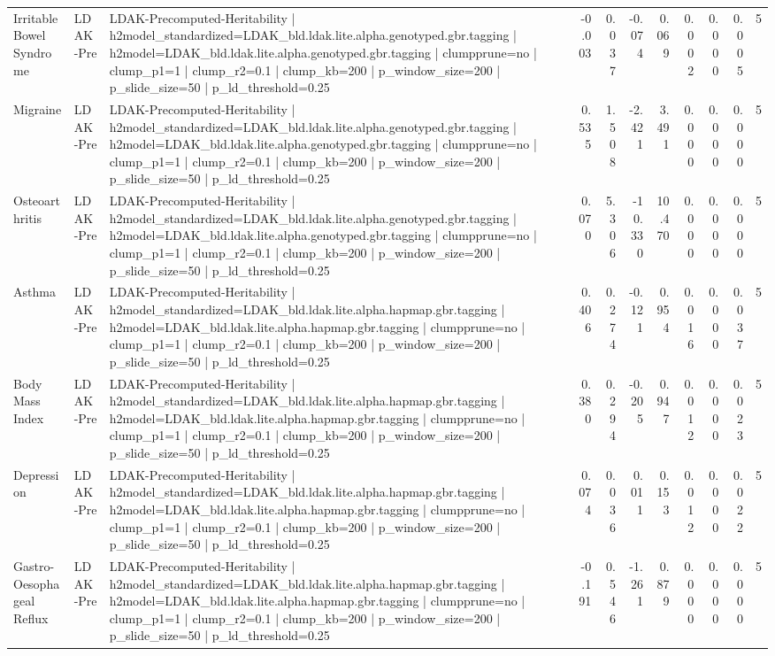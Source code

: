 \begin{landscape}
\begin{longtable}{p{2.4cm}p{1.8cm}p{6.0cm}rrrrrrrr}
Irritable Bowel Syndrome & LDAK-Pre & LDAK-Precomputed-Heritability | h2model\_standardized=LDAK\_bld.ldak.lite.alpha.genotyped.gbr.tagging | h2model=LDAK\_bld.ldak.lite.alpha.genotyped.gbr.tagging | clumpprune=no | clump\_p1=1 | clump\_r2=0.1 | clump\_kb=200 | p\_window\_size=200 | p\_slide\_size=50 | p\_ld\_threshold=0.25 & -0.003 & 0.037 & -0.074 & 0.069 & 0.002 & 0.000 & 0.005 & 5 \\
Migraine & LDAK-Pre & LDAK-Precomputed-Heritability | h2model\_standardized=LDAK\_bld.ldak.lite.alpha.genotyped.gbr.tagging | h2model=LDAK\_bld.ldak.lite.alpha.genotyped.gbr.tagging | clumpprune=no | clump\_p1=1 | clump\_r2=0.1 | clump\_kb=200 | p\_window\_size=200 | p\_slide\_size=50 | p\_ld\_threshold=0.25 & 0.535 & 1.508 & -2.421 & 3.491 & 0.000 & 0.000 & 0.000 & 5 \\
Osteoarthritis & LDAK-Pre & LDAK-Precomputed-Heritability | h2model\_standardized=LDAK\_bld.ldak.lite.alpha.genotyped.gbr.tagging | h2model=LDAK\_bld.ldak.lite.alpha.genotyped.gbr.tagging | clumpprune=no | clump\_p1=1 | clump\_r2=0.1 | clump\_kb=200 | p\_window\_size=200 | p\_slide\_size=50 | p\_ld\_threshold=0.25 & 0.070 & 5.306 & -10.330 & 10.470 & 0.000 & 0.000 & 0.000 & 5 \\
Asthma & LDAK-Pre & LDAK-Precomputed-Heritability | h2model\_standardized=LDAK\_bld.ldak.lite.alpha.hapmap.gbr.tagging | h2model=LDAK\_bld.ldak.lite.alpha.hapmap.gbr.tagging | clumpprune=no | clump\_p1=1 | clump\_r2=0.1 | clump\_kb=200 | p\_window\_size=200 | p\_slide\_size=50 | p\_ld\_threshold=0.25 & 0.406 & 0.274 & -0.121 & 0.954 & 0.016 & 0.000 & 0.037 & 5 \\
Body Mass Index & LDAK-Pre & LDAK-Precomputed-Heritability | h2model\_standardized=LDAK\_bld.ldak.lite.alpha.hapmap.gbr.tagging | h2model=LDAK\_bld.ldak.lite.alpha.hapmap.gbr.tagging | clumpprune=no | clump\_p1=1 | clump\_r2=0.1 | clump\_kb=200 | p\_window\_size=200 | p\_slide\_size=50 | p\_ld\_threshold=0.25 & 0.380 & 0.294 & -0.205 & 0.947 & 0.012 & 0.000 & 0.023 & 5 \\
Depression & LDAK-Pre & LDAK-Precomputed-Heritability | h2model\_standardized=LDAK\_bld.ldak.lite.alpha.hapmap.gbr.tagging | h2model=LDAK\_bld.ldak.lite.alpha.hapmap.gbr.tagging | clumpprune=no | clump\_p1=1 | clump\_r2=0.1 | clump\_kb=200 | p\_window\_size=200 | p\_slide\_size=50 | p\_ld\_threshold=0.25 & 0.074 & 0.036 & 0.011 & 0.153 & 0.012 & 0.000 & 0.022 & 5 \\
Gastro-Oesophageal Reflux & LDAK-Pre & LDAK-Precomputed-Heritability | h2model\_standardized=LDAK\_bld.ldak.lite.alpha.hapmap.gbr.tagging | h2model=LDAK\_bld.ldak.lite.alpha.hapmap.gbr.tagging | clumpprune=no | clump\_p1=1 | clump\_r2=0.1 | clump\_kb=200 | p\_window\_size=200 | p\_slide\_size=50 | p\_ld\_threshold=0.25 & -0.191 & 0.546 & -1.261 & 0.879 & 0.000 & 0.000 & 0.000 & 5 \\

\end{longtable}
\end{landscape}
